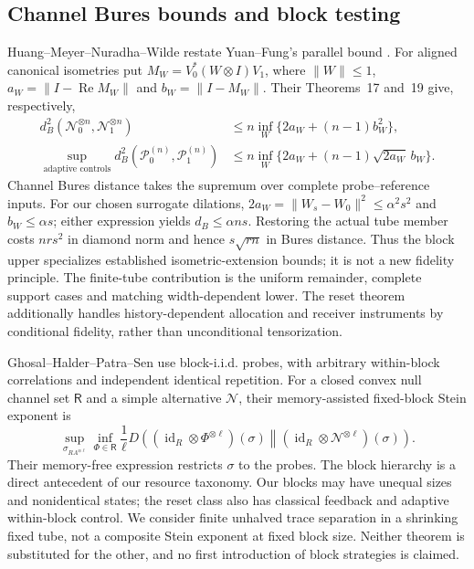 \subsection{Channel Bures bounds and block testing}
Huang--Meyer--Nuradha--Wilde \cite[Theorem~17, Remark~18]{HMNW88}
restate Yuan--Fung's parallel bound \cite[equation~(23)]{YF76}.
For aligned canonical isometries put
$M_W=V_0^*(W\otimes I)V_1$, where $\|W\|\le1$,
$a_W=\|I-\operatorname{Re}M_W\|$ and $b_W=\|I-M_W\|$.
Their Theorems~17 and~19 give, respectively,
\begin{align*}
 d_B^2(\mathcal N_0^{\otimes n},\mathcal N_1^{\otimes n})
 &\le n\inf_W\{2a_W+(n-1)b_W^2\},\\
 \sup_{\text{adaptive controls}}d_B^2(\mathcal P_0^{(n)},\mathcal P_1^{(n)})
 &\le n\inf_W\{2a_W+(n-1)\sqrt{2a_W}\,b_W\}.
\end{align*}
Channel Bures distance takes the supremum over complete
probe--reference inputs.  For our chosen surrogate dilations,
$2a_W=\|W_s-W_0\|^2\le\alpha^2s^2$ and
$b_W\le\alpha s$; either expression yields
$d_B\le\alpha ns$.  Restoring the actual tube member costs
$nrs^2$ in diamond norm and hence $s\sqrt{rn}$ in Bures distance.
Thus the block upper specializes established isometric-extension
bounds; it is not a new fidelity principle.  The finite-tube
contribution is the uniform remainder, complete support cases and
matching width-dependent lower.  The reset theorem additionally
handles history-dependent allocation and receiver instruments by
conditional fidelity, rather than unconditional tensorization.

Ghosal--Halder--Patra--Sen \cite[Section~III, Theorem~1]{GHPS88}
use block-i.i.d. probes, with arbitrary within-block correlations
and independent identical repetition.  For a closed convex null
channel set $\mathsf R$ and a simple alternative $\mathcal N$,
their memory-assisted fixed-block Stein exponent is
\[
 \sup_{\sigma_{RA^{\otimes\ell}}}\inf_{\Phi\in\mathsf R}
 \frac1\ell D\!\left((\operatorname{id}_R\otimes\Phi^{\otimes\ell})(\sigma)
 \middle\|(\operatorname{id}_R\otimes\mathcal N^{\otimes\ell})(\sigma)\right).
\]
Their memory-free expression restricts $\sigma$ to the probes.
The block hierarchy is a direct antecedent of our resource taxonomy.
Our blocks may have unequal sizes and nonidentical states; the reset
class also has classical feedback and adaptive within-block control.
We consider finite unhalved trace separation in a shrinking fixed tube,
not a composite Stein exponent at fixed block size.  Neither theorem
is substituted for the other, and no first introduction of block
strategies is claimed.

